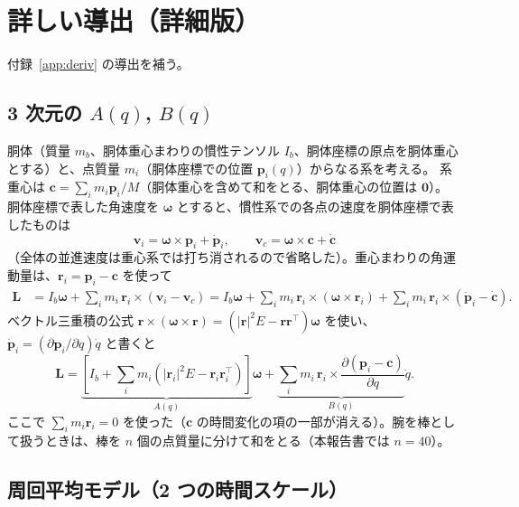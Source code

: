 \chapter{詳しい導出（詳細版）}\label{app:more}

付録~\ref{app:deriv} の導出を補う。

\section{3 次元の $A(q)$, $B(q)$}

胴体（質量 $m_b$、胴体重心まわりの慣性テンソル $I_b$、胴体座標の原点を胴体重心とする）と、点質量 $m_i$（胴体座標での位置 $\bm p_i(q)$）からなる系を考える。
系重心は $\bm c = \sum_i m_i\bm p_i/M$（胴体重心を含めて和をとる、胴体重心の位置は $\bm 0$）。
胴体座標で表した角速度を $\bm\omega$ とすると、慣性系での各点の速度を胴体座標で表したものは
\[
\bm v_i = \bm\omega\times\bm p_i + \dot{\bm p}_i,\qquad \bm v_c = \bm\omega\times\bm c + \dot{\bm c}
\]
（全体の並進速度は重心系では打ち消されるので省略した）。重心まわりの角運動量は、$\bm r_i=\bm p_i-\bm c$ を使って
\begin{align}
\bm L &= I_b\bm\omega + \sum_i m_i\,\bm r_i\times(\bm v_i-\bm v_c)
 = I_b\bm\omega + \sum_i m_i\,\bm r_i\times(\bm\omega\times\bm r_i) + \sum_i m_i\,\bm r_i\times(\dot{\bm p}_i-\dot{\bm c}).
\end{align}
ベクトル三重積の公式 $\bm r\times(\bm\omega\times\bm r) = (|\bm r|^2E-\bm r\bm r^\top)\bm\omega$ を使い、
$\dot{\bm p}_i = (\partial\bm p_i/\partial q)\dot q$ と書くと
\begin{equation}
\bm L = \underbrace{\left[I_b + \sum_i m_i\left(|\bm r_i|^2E-\bm r_i\bm r_i^\top\right)\right]}_{A(q)}\bm\omega
 + \underbrace{\sum_i m_i\,\bm r_i\times\frac{\partial(\bm p_i-\bm c)}{\partial q}}_{B(q)}\dot q .
\end{equation}
ここで $\sum_im_i\bm r_i = 0$ を使った（$\bm c$ の時間変化の項の一部が消える）。腕を棒として扱うときは、棒を $n$ 個の点質量に分けて和をとる（本報告書では $n=40$）。

\section{周回平均モデル（2 つの時間スケール）}

